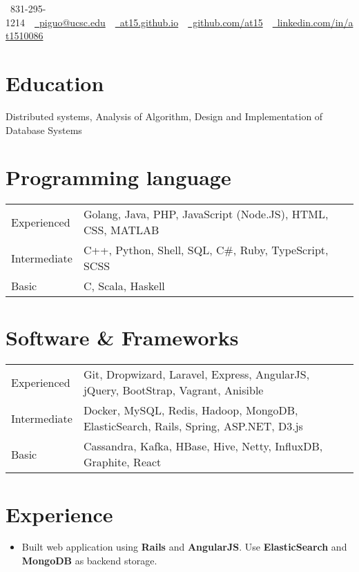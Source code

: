 \documentclass[10pt, letterpaper]{simple-cv}
\begin{document}
\centerline{\faMobile\ 831-295-1214\ \
\href{mailto:piguo@ucsc.edu}{\faEnvelope\ piguo@ucsc.edu}\ \
\href{https://at15.github.io}{\faHome\ at15.github.io}\ \
\href{https://github.com/at15}{\faGithubSquare\ github.com/at15}\ \
\href{https://www.linkedin.com/in/at1510086}{\faLinkedinSquare\ linkedin.com/in/at1510086}}

\section{Education}
Distributed systems, Analysis of Algorithm, Design and Implementation of Database Systems

\section{Programming language}
\begin{tabular}{ l l }
 Experienced &  Golang, Java, PHP, JavaScript (Node.JS), HTML, CSS, MATLAB \\
 Intermediate & C++, Python, Shell, SQL, C\#, Ruby, TypeScript, SCSS \\
 Basic & C, Scala, Haskell
\end{tabular}

\section{Software \& Frameworks}
\begin{tabular}{ l l }
 Experienced & Git, Dropwizard, Laravel, Express, AngularJS, jQuery, BootStrap, Vagrant, Anisible\\
 Intermediate & Docker, MySQL, Redis, Hadoop, MongoDB, ElasticSearch, Rails, Spring, ASP.NET, D3.js \\
 Basic & Cassandra, Kafka, HBase, Hive, Netty, InfluxDB, Graphite, React
\end{tabular}

\section{Experience}

\begin{itemize}
\item Built web application using \textbf{Rails} and \textbf{AngularJS}. Use \textbf{ElasticSearch} and \textbf{MongoDB} as backend storage.
\end{itemize}
\end{document}
